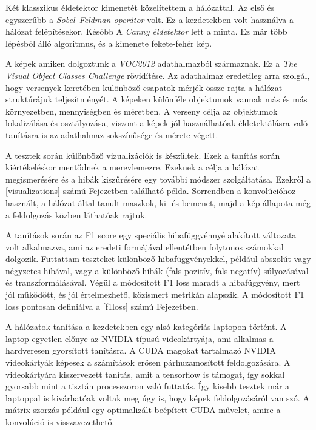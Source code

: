 \documentclass[12pt]{report}
\begin{document}
Két klasszikus éldetektor kimenetét közelítettem a hálózattal. Az első és egyszerűbb a \textit{Sobel–Feldman operátor} \cite{sobel} volt. Ez a kezdetekben volt használva a hálózat felépítésekor. Később A \textit{Canny éldetektor} \cite{canny} lett a minta. Ez már több lépésből álló algoritmus, és a kimenete fekete-fehér kép.

A képek amiken dolgoztunk a \textit{VOC2012} \cite{pascal-voc-2012} adathalmazból származnak. Ez a \textit{The Visual Object Classes Challenge} rövidítése. Az adathalmaz eredetileg arra szolgál, hogy versenyek keretében különböző csapatok mérjék össze rajta a hálózat struktúrájuk teljesítményét. A képeken különféle objektumok vannak más és más környezetben, mennyiségben és méretben. A verseny célja az objektumok lokalizálása és osztályozása, viszont a képek jól használhatóak éldetektálásra való tanításra is az adathalmaz sokszínűsége és mérete végett.

A tesztek során különböző vizualizációk is készültek. Ezek a tanítás során kiértékeléskor mentődnek a merevlemezre. Ezeknek a célja a hálózat megismerésére és a hibák kiszűrésére egy további módszer szolgáltatása. Ezekről a \ref{visualizations} számú Fejezetben található példa. Sorrendben a konvolúcióhoz használt, a hálózat által tanult maszkok, ki- és bemenet, majd a kép állapota még a feldolgozás közben láthatóak rajtuk.

A tanítások során az F1 score egy speciális hibafüggvénnyé alakított változata volt alkalmazva, ami az eredeti formájával ellentétben folytonos számokkal dolgozik. Futtattam teszteket különböző hibafüggvényekkel, például abszolút vagy négyzetes hibával, vagy a különböző hibák (fals pozitív, fals negatív) súlyozásával és transzformálásával. Végül a módosított F1 loss maradt a hibafüggvény, mert jól működött, és jól értelmezhető, közismert metrikán alapszik. A módosított F1 loss pontosan definiálva a \ref{f1loss} számú Fejezetben.

A hálózatok tanítása a kezdetekben egy alsó kategóriás laptopon történt. A laptop egyetlen előnye az NVIDIA típusú videokártyája, ami alkalmas a hardveresen gyorsított tanításra. A CUDA magokat tartalmazó NVIDIA videokártyák képesek a számítások erősen párhuzamosított feldolgozására. A videokártyára kiszervezett tanítás, amit a tensorflow is támogat, így sokkal gyorsabb mint a tisztán processzoron való futtatás. Így kisebb tesztek már a laptoppal is kivárhatóak voltak meg úgy is, hogy képek feldolgozásáról van szó. A mátrix szorzás például egy optimalizált beépített CUDA művelet, amire a konvolúció is visszavezethető.
\end{document}
